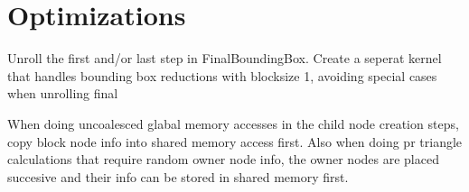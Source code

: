 \chapter{Optimizations}

Unroll the first and/or last step in FinalBoundingBox. Create a
seperat kernel that handles bounding box reductions with blocksize 1,
avoiding special cases when unrolling final

When doing uncoalesced glabal memory accesses in the child node
creation steps, copy block node info into shared memory access first.
Also when doing pr triangle calculations that require random owner
node info, the owner nodes are placed succesive and their info can be
stored in shared memory first.
